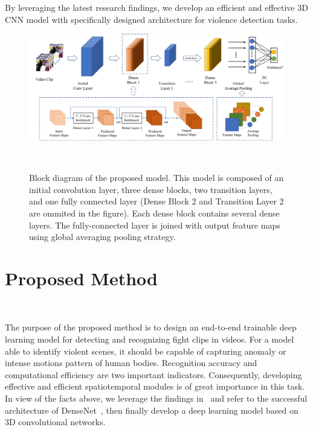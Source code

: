 \documentclass[10pt,twocolumn,letterpaper]{article}
\begin{document}
By leveraging the latest research findings, we develop an efficient and effective 3D CNN model with specifically designed architecture for violence detection tasks.



\begin{figure}
\begin{center}
\includegraphics[scale=0.52]{fig/fig1.png}
\end{center}
\caption{Block diagram of the proposed model. This model is composed of an initial convolution layer, three dense blocks, two transition layers, and one fully connected layer (Dense Block 2 and Transition Layer 2 are ommited in the figure). Each dense block contains several dense layers. The fully-connected layer is joined with output feature maps using global averaging pooling strategy.}
~\label{fig:model}
\end{figure}
	
	

\section{Proposed Method}
~\label{sec:3}

The purpose of the proposed method is to design an end-to-end trainable deep learning model for detecting and recognizing fight clips in videos. 
For a model able to identify violent scenes, it should be capable of capturing anomaly or intense motions pattern of human bodies. 
Recognition accuracy and computational efficiency are two important indicators.
Consequently, developing effective and efficient spatiotemporal modules is of great importance in this task.
In view of the facts above, we leverage the findings in~\cite{3dcnn_1, 3dcnn_2, r2+1d} and refer to the successful architecture of DenseNet~\cite{densenet}, then finally develop a deep learning model based on 3D convolutional networks.
\end{document}
